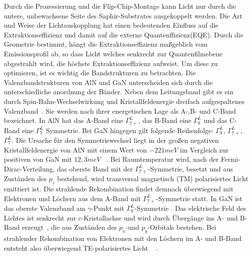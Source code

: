 \vspace{0.1cm}
\raggedright
Durch die Prozessierung und die Flip-Chip-Montage kann Licht nur durch die untere, unbewachsene Seite des Saphir-Substrates ausgekoppelt werden. Die Art und Weise der Lichtauskopplung hat einen bedeutenden Einfluss auf die Extraktionseffizienz und damit auf die externe Quantenffizienz(EQE). Durch die Geometrie bestimmt, hängt die Extraktionseffizienz maßgeblich vom Emissionsprofil ab, so dass Licht welches senkrecht zur Quantenfilmebene abgestrahlt wird, die höchste Extraktionseffizienz aufweist. 
Um diese zu optimieren, ist es wichtig die Bandstrukturen zu betrachten.
\newline
Die Valenzbandstrukturen von AlN und GaN unterscheiden sich durch die unterschiedliche anordnung der Bänder. Neben dem Leitungsband gibt es ein durch Spin-Bahn-Wechselwirkung und Kristallfeldenergie dreifach aufgespaltenes Valenzband~\cite{doi:10.1063/1.117689}. Sie werden nach ihrer energetischen Lage als A-,B- und C-Band bezeichnet. In AlN hat das A-Band eine $\Gamma^{L}_{7+}$, das B-Band eine $\Gamma^{L}_{9}$ und das C-Band eine $\Gamma^{L}_{7}$ Symmetrie. Bei GaN hingegen gilt folgende Reihenfolge:  $\Gamma^{L}_{9}$, $\Gamma^{L}_{7+}$, $\Gamma^{L}_{7}$. Die Ursache für den Symmetriewechsel liegt in der großen negativen Kristallfeldenergie von AlN mit einem Wert von $-221meV$ \cite{PhysRevB.87.235209} im Vergleich zur positiven von GaN mit $12,3meV$ ~\cite{PhysRevB.81.155202}. Bei Raumtemperatur wird, nach der Fermi-Dirac-Verteilung, das oberste Band mit der $\Gamma^{L}_{7+}$-Symmetrie, besetzt und aus Zuständen des $p_z$ bestehend, wird transversal magnetisch (TM) polarisiertes Licht emittiert ist. Die strahlende Rekombination findet demnach überwiegend mit Elektronen und Löchern aus dem A-Band mit $\Gamma^{L}_{7+}$-Symmetrie statt.
In GaN ist das oberste Valenzband am $\gamma$-Punkt mit $\Gamma^{L}_{9}$-Symmetrie . Das elektrische Feld des Lichtes ist senkrecht zur c-Kristallachse und wird durch Übergänge ins A- und B- Band erzeugt~\cite{doi:10.1063/1.3574025}, die aus Zuständen des $p_x$-und $p_y$-Orbitals bestehen. Bei strahlender Rekombination von Elektronen mit den Löchern im A- und B-Band entsteht also überwiegend TE-polarisiertes Licht ~\cite{doi:10.1063/1.3574025} . 
%
